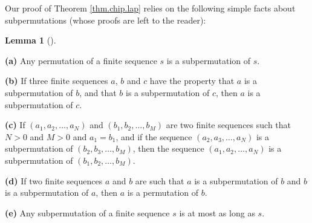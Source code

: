 \documentclass[numbers=enddot,12pt,final,onecolumn,notitlepage]{scrartcl}%
\theoremstyle{definition}
\newtheorem{lem}[theo]{Lemma}
\newenvironment{lemma}[1][]
{\begin{lem}[#1]\begin{leftbar}}
{\end{leftbar}\end{lem}}
\newcommand{\tup}[1]{\left( #1 \right)}
\begin{document}
Our proof of Theorem \ref{thm.chip.lap} relies on the following
simple facts about subpermutations (whose proofs are left
to the reader):

\begin{lemma} \label{lem.subper.simple-stuff}
\textbf{(a)} Any permutation of a finite sequence $s$ is a
subpermutation of $s$.

\textbf{(b)} If three finite sequences $a$, $b$ and $c$ have
the property that $a$ is a subpermutation of $b$, and that
$b$ is a subpermutation of $c$, then
$a$ is a subpermutation of $c$.

\textbf{(c)} If $\tup{a_1, a_2, \ldots, a_N}$
and $\tup{b_1, b_2, \ldots, b_M}$ are two finite sequences
such that $N > 0$ and $M > 0$ and $a_1 = b_1$,
and if the sequence $\tup{a_2, a_3, \ldots, a_N}$ is a
subpermutation of $\tup{b_2, b_3, \ldots, b_M}$, then
the sequence $\tup{a_1, a_2, \ldots, a_N}$ is a
subpermutation of $\tup{b_1, b_2, \ldots, b_M}$.

\textbf{(d)} If two finite sequences $a$ and $b$ are such
that $a$ is a subpermutation of $b$ and $b$ is a subpermutation
of $a$, then $a$ is a permutation of $b$.

\textbf{(e)} Any subpermutation of a finite sequence $s$ is
at most as long as $s$.
\end{lemma}
\end{document}
